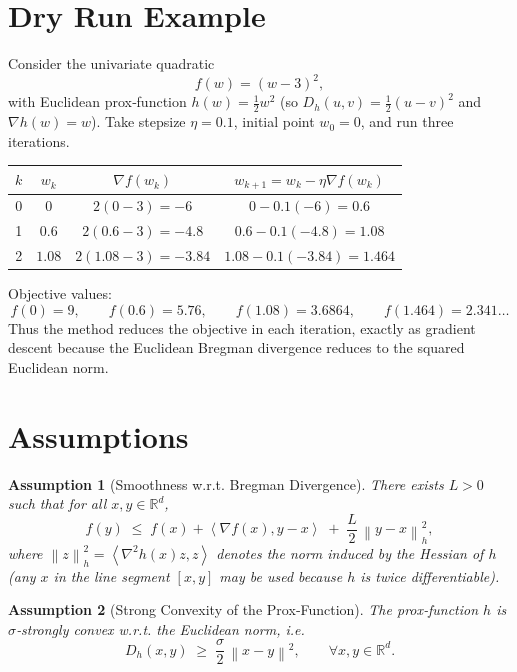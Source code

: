 \documentclass[11pt]{article}
\newtheorem{assumption}{Assumption}
\newcommand{\norm}[1]{\left\lVert#1\right\rVert}
\newcommand{\inner}[2]{\left\langle #1,#2\right\rangle}
\newcommand{\D}[2]{D_{h}(#1,#2)}
\begin{document}
\section*{Dry Run Example}
Consider the univariate quadratic
\[
f(w)= (w-3)^{2},
\]
with Euclidean prox‑function $h(w)=\tfrac12 w^{2}$ (so $D_{h}(u,v)=\tfrac12 (u-v)^{2}$ and $\nabla h(w)=w$).  
Take stepsize $\eta=0.1$, initial point $w_{0}=0$, and run three iterations.

\begin{center}
\begin{tabular}{c|c|c|c}
$k$ & $w_{k}$ & $\nabla f(w_{k})$ & $w_{k+1}=w_{k}-\eta\nabla f(w_{k})$\\\hline
0 & $0$ & $2(0-3)=-6$ & $0-0.1(-6)=0.6$\\
1 & $0.6$ & $2(0.6-3)=-4.8$ & $0.6-0.1(-4.8)=1.08$\\
2 & $1.08$ & $2(1.08-3)=-3.84$ & $1.08-0.1(-3.84)=1.464$\\
\end{tabular}
\end{center}

Objective values:
\[
f(0)=9,\qquad f(0.6)=5.76,\qquad f(1.08)=3.6864,\qquad f(1.464)=2.341\ldots
\]
Thus the method reduces the objective in each iteration, exactly as gradient descent because the Euclidean Bregman divergence reduces to the squared Euclidean norm.

\section*{Assumptions}
\begin{assumption}[Smoothness w.r.t. Bregman Divergence]
\label{as:smooth}
There exists $L>0$ such that for all $x,y\in\mathbb{R}^{d}$,
\begin{equation}
\label{eq:smooth}
f(y)\;\le\; f(x)+\inner{\nabla f(x)}{y-x}
\;+\;\frac{L}{2}\,\norm{y-x}_{h}^{2},
\end{equation}
where $\norm{z}_{h}^{2}= \inner{\nabla^{2}h(x)z}{z}$ denotes the norm induced by the Hessian of $h$ (any $x$ in the line segment $[x,y]$ may be used because $h$ is twice differentiable).
\end{assumption}

\begin{assumption}[Strong Convexity of the Prox‑Function]
\label{as:strong}
The prox‑function $h$ is $\sigma$‑strongly convex w.r.t. the Euclidean norm, i.e.
\begin{equation}
\label{eq:strong}
\D{x}{y}\;\ge\;\frac{\sigma}{2}\,\norm{x-y}^{2},\qquad\forall x,y\in\mathbb{R}^{d}.
\end{equation}
\end{assumption}
\end{document}
